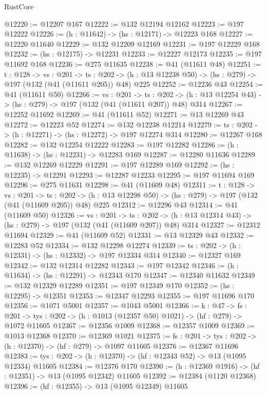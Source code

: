 \begin{lexlean}{RustCore}
\begin{coremodule}
@12220 := @12207 @167
@12222 := @132 @12194 @12162
@12223 := @197 @12222
@12226 := (h : @11642) -> (hs : @12171) -> @12223 @168
@12227 := @12220 @11640
@12229 := @132 @12209 @12169
@12231 := @197 @12229 @168
@12232 := (hs : @12175) -> @12231
@12233 := @12227 @12173
@12235 := @197 @11692 @168
@12236 := @275 @11635
@12238 := @41 (@11611 @48)
@12251 := {t : @128} ->
  {vs : @201} ->
  {ts : @202} -> (h : @13 @12238 @50) -> (hs : @279) -> @197 (@132 (@41 (@11611 @205)) @48) @225
@12252 := @12236 @43
@12254 := @41 (@11611 @50)
@12266 := {vs : @201} ->
  {ts : @202} -> (h : @13 @12254 @43) -> (hs : @279) -> @197 (@132 (@41 (@11611 @207)) @48) @314
@12267 := @12252 @11692
@12269 := @41 (@11611 @52)
@12271 := @13 @12269 @43
@12272 := @12223 @52
@12274 := @132 @12238 @12214
@12279 := {ts : @202} -> (h : @12271) -> (hs : @12272) -> @197 @12274 @314
@12280 := @12267 @168
@12282 := @132 @12254 @12222
@12283 := @197 @12282
@12286 := (h : @11638) -> (hs : @12231) -> @12283 @169
@12287 := @12280 @11636
@12289 := @132 @12269 @12229
@12291 := @197 @12289 @169
@12292 := (hs : @12235) -> @12291
@12293 := @12287 @12233
@12295 := @197 @11694 @169
@12296 := @275 @11631
@12298 := @41 (@11609 @48)
@12311 := {t : @128} ->
  {vs : @201} ->
  {ts : @202} -> (h : @13 @12298 @50) -> (hs : @279) -> @197 (@132 (@41 (@11609 @205)) @48) @225
@12312 := @12296 @43
@12314 := @41 (@11609 @50)
@12326 := {vs : @201} ->
  {ts : @202} -> (h : @13 @12314 @43) -> (hs : @279) -> @197 (@132 (@41 (@11609 @207)) @48) @314
@12327 := @12312 @11694
@12329 := @41 (@11609 @52)
@12331 := @13 @12329 @43
@12332 := @12283 @52
@12334 := @132 @12298 @12274
@12339 := {ts : @202} -> (h : @12331) -> (hs : @12332) -> @197 @12334 @314
@12340 := @12327 @169
@12342 := @132 @12314 @12282
@12343 := @197 @12342
@12346 := (h : @11634) -> (hs : @12291) -> @12343 @170
@12347 := @12340 @11632
@12349 := @132 @12329 @12289
@12351 := @197 @12349 @170
@12352 := (hs : @12295) -> @12351
@12353 := @12347 @12293
@12355 := @197 @11696 @170
@12356 := @1071 @5001
@12357 := @1043 @5001
@12366 := {k : @47} ->
  {fs : @201} -> {tys : @202} -> (h : @1013 (@12357 @50) @1021) -> (hf : @279) -> @1072 @11605
@12367 := @12356 @1009
@12368 := @12357 @1009
@12369 := @1013 @12368
@12370 := @12369 @1021
@12375 := {fs : @201} -> {tys : @202} -> (h : @12370) -> (hf : @279) -> @1097 @11605
@12376 := @12367 @11696
@12383 := {tys : @202} -> (h : @12370) -> (hf : @12343 @52) -> @13 (@1095 @12334) @11605
@12384 := @12376 @170
@12390 := (h : @12369 @1916) -> (hf : @12351) -> @13 (@1095 @12342) @11605
@12392 := @12384 (@1120 @12368)
@12396 := (hf : @12355) -> @13 (@1095 @12349) @11605

\end{coremodule}
\end{lexlean}
